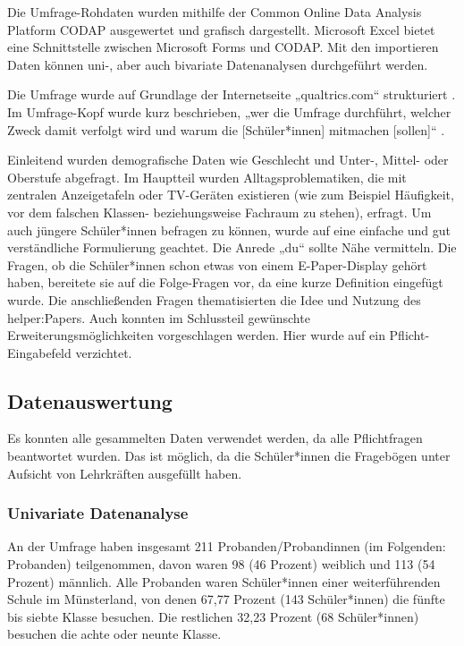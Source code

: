 \documentclass[10pt]{article}
\begin{document}
Die Umfrage-Rohdaten wurden mithilfe der Common Online Data Analysis Platform CODAP \cite{CODAP} ausgewertet und grafisch dargestellt. Microsoft Excel bietet eine Schnittstelle zwischen Microsoft Forms und CODAP. Mit den importieren Daten können uni-, aber auch bivariate Datenanalysen durchgeführt werden.

Die Umfrage wurde auf Grundlage der Internetseite „qualtrics.com“ strukturiert \cite{Erstellung_Fragebogen}.
Im Umfrage-Kopf wurde kurz beschrieben, „wer die Umfrage durchführt, welcher Zweck damit verfolgt wird und warum die [Schüler*innen] mitmachen [sollen]“ \cite[Struktur]{Erstellung_Fragebogen}.

Einleitend wurden demografische Daten wie Geschlecht und Unter-, Mittel- oder Oberstufe abgefragt.
Im Hauptteil wurden Alltagsproblematiken, die mit zentralen Anzeigetafeln oder TV-Geräten existieren (wie zum Beispiel Häufigkeit, vor dem falschen Klassen- beziehungsweise Fachraum zu stehen), erfragt. Um auch jüngere Schüler*innen befragen zu können, wurde auf eine einfache und gut verständliche Formulierung geachtet. Die Anrede „du“ sollte Nähe vermitteln. 
Die Fragen, ob die Schüler*innen schon etwas von einem E-Paper-Display gehört haben, bereitete sie auf die Folge-Fragen vor, da eine kurze Definition eingefügt wurde. 
Die anschließenden Fragen thematisierten die Idee und Nutzung des helper:Papers. Auch konnten im Schlussteil gewünschte Erweiterungsmöglichkeiten vorgeschlagen werden. Hier wurde auf ein Pflicht-Eingabefeld verzichtet.

\subsection{Datenauswertung}
Es konnten alle gesammelten Daten verwendet werden, da alle Pflichtfragen beantwortet wurden. Das ist möglich, da die Schüler*innen die Fragebögen unter Aufsicht von Lehrkräften ausgefüllt haben. 

\subsubsection{Univariate Datenanalyse} \label{Univariate Datenanalyse}

An der Umfrage haben insgesamt 211 Probanden/Probandinnen (im Folgenden: Probanden) teilgenommen, davon waren 98 (46 Prozent) weiblich und 113 (54 Prozent) männlich. Alle Probanden waren Schüler*innen einer weiterführenden Schule im Münsterland, von denen 67,77 Prozent (143 Schüler*innen) die fünfte bis siebte Klasse besuchen. Die restlichen 32,23 Prozent (68 Schüler*innen) besuchen die achte oder neunte Klasse. 
\end{document}
